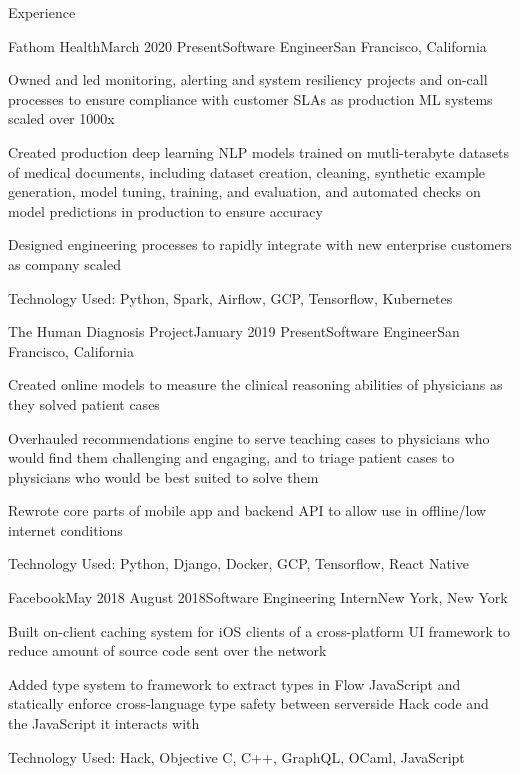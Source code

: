 \documentclass{resume} %
\begin{document}
\begin{rSection}{Experience}
\begin{rSubsection}{Fathom Health}{March 2020 \textminus Present}{Software Engineer}{San Francisco, California}
\item[] Owned and led monitoring, alerting and system resiliency projects and on-call processes to ensure compliance with customer SLAs as production ML systems scaled over 1000x
\item[] Created production deep learning NLP models trained on mutli-terabyte datasets of medical documents, including dataset creation, cleaning, synthetic example generation, model tuning, training, and evaluation, and automated checks on model predictions in production to ensure accuracy
\item[] Designed engineering processes to rapidly integrate with new enterprise customers as company scaled
\item[] Technology Used: Python, Spark, Airflow, GCP, Tensorflow, Kubernetes
\end{rSubsection}
\begin{rSubsection}{The Human Diagnosis Project}{January 2019 \textminus Present}{Software Engineer}{San Francisco, California}
\item[] Created online models to measure the clinical reasoning abilities of physicians as they solved patient cases
\item[] Overhauled recommendations engine to serve teaching cases to physicians who would find them challenging and engaging, and to triage patient cases to physicians who would be best suited to solve them
\item[] Rewrote core parts of mobile app and backend API to allow use in offline/low internet conditions
\item[] Technology Used: Python, Django, Docker, GCP, Tensorflow, React Native
\end{rSubsection}
\begin{rSubsection}{Facebook}{May 2018 \textminus August 2018}{Software Engineering Intern}{New York, New York}
\item[] Built on-client caching system for iOS clients of a cross-platform UI framework to reduce amount of source code sent over the network
\item[] Added type system to framework to extract types in Flow JavaScript and statically enforce cross-language type safety between serverside Hack code and the JavaScript it interacts with
\item[] Technology Used: Hack, Objective C, C++, GraphQL, OCaml, JavaScript

\end{rSubsection}
\end{rSection}
\end{document}
